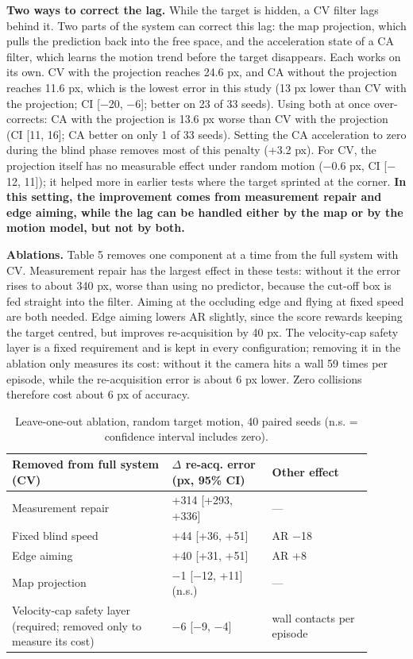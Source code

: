 \documentclass[12pt,a4paper]{article}
\begin{document}
\textbf{Two ways to correct the lag.} While the target is hidden, a CV filter lags behind it. Two parts of the system can correct this lag: the map projection, which pulls the prediction back into the free space, and the acceleration state of a CA filter, which learns the motion trend before the target disappears. Each works on its own. CV with the projection reaches 24.6 px, and CA without the projection reaches 11.6 px, which is the lowest error in this study (13 px lower than CV with the projection; CI [$-$20, $-$6]; better on 23 of 33 seeds). Using both at once over-corrects: CA with the projection is 13.6 px worse than CV with the projection (CI [11, 16]; CA better on only 1 of 33 seeds). Setting the CA acceleration to zero during the blind phase removes most of this penalty (+3.2 px). For CV, the projection itself has no measurable effect under random motion ($-$0.6 px, CI [$-$12, 11]); it helped more in earlier tests where the target sprinted at the corner. \textbf{In this setting, the improvement comes from measurement repair and edge aiming, while the lag can be handled either by the map or by the motion model, but not by both.}

\textbf{Ablations.} Table 5 removes one component at a time from the full system with CV. Measurement repair has the largest effect in these tests: without it the error rises to about 340 px, worse than using no predictor, because the cut-off box is fed straight into the filter. Aiming at the occluding edge and flying at fixed speed are both needed. Edge aiming lowers AR slightly, since the score rewards keeping the target centred, but improves re-acquisition by 40 px. The velocity-cap safety layer is a fixed requirement and is kept in every configuration; removing it in the ablation only measures its cost: without it the camera hits a wall 59 times per episode, while the re-acquisition error is about 6 px lower. Zero collisions therefore cost about 6 px of accuracy.

\begin{table}[htbp]
  \centering
  \small
  \caption{Leave-one-out ablation, random target motion, 40 paired seeds (n.s. = confidence interval includes zero).}
  \renewcommand{\arraystretch}{1.15}
  \begin{tabular}{>{\raggedright\arraybackslash}p{0.40\linewidth}>{\raggedright\arraybackslash}p{0.25\linewidth}>{\raggedright\arraybackslash}p{0.25\linewidth}}
  \toprule
  \textbf{Removed from full system (CV)} & \textbf{$\Delta$ re-acq. error (px, 95\% CI)} & \textbf{Other effect} \\
  \midrule
  Measurement repair & +314 [+293, +336] & — \\
  Fixed blind speed & +44 [+36, +51] & AR $-$18 \\
  Edge aiming & +40 [+31, +51] & AR +8 \\
  Map projection & $-$1 [$-$12, +11] (n.s.) & — \\
  Velocity-cap safety layer (required; removed only to measure its cost) & $-$6 [$-$9, $-$4] & 59 wall contacts per episode \\
  \bottomrule
  \end{tabular}
\end{table}
\end{document}
